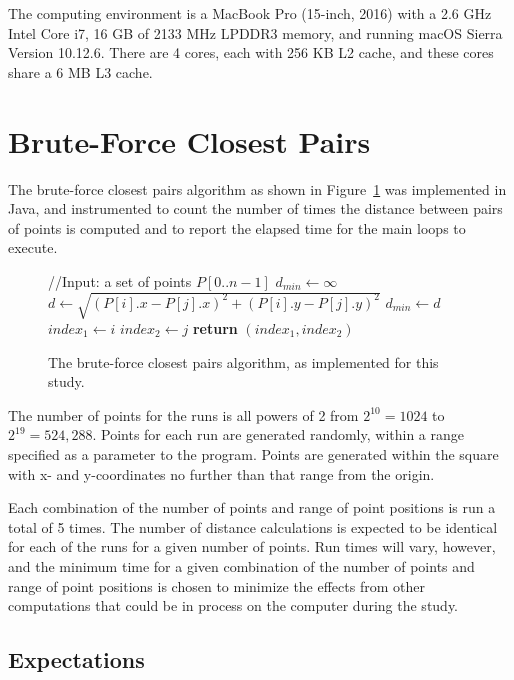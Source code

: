\documentclass[12pt]{article}
\begin{document}
The computing environment is a MacBook Pro (15-inch, 2016) with a 2.6
GHz Intel Core i7, 16 GB of 2133 MHz LPDDR3 memory, and running macOS
Sierra Version 10.12.6.  There are 4 cores, each with 256 KB L2 cache,
and these cores share a 6 MB L3 cache.

\section{Brute-Force Closest Pairs}
\label{sec:bfcp}

The brute-force closest pairs algorithm as shown in
Figure~\ref{fig:alg} was implemented in Java, and instrumented to
count the number of times the distance between pairs of points is
computed and to report the elapsed time for the main loops to execute.

\begin{figure}[htb]
  \centering
\begin{algorithmic}
  \State //Input: a set of points $P[0..n-1]$
  \State $d_{min} \gets \infty$
  \State $d \gets \sqrt{(P[i].x - P[j].x)^2 +(P[i].y - P[j].y)^2}$
  \State $d_{min} \gets d$
  \State $index_1 \gets i$
  \State $index_2 \gets j$
  \EndIf
  \EndFor
  \EndFor
  \State \textbf{return} $(index_1, index_2)$
\EndProcedure
\end{algorithmic}
\caption{The brute-force closest pairs algorithm, as implemented for
  this study.}
\label{fig:alg}
\end{figure}

The number of points for the runs is all powers of 2 from
$2^{10}=1024$ to $2^{19}=524,288$.  Points for each run are generated
randomly, within a range specified as a parameter to the program.
Points are generated within the square with x- and y-coordinates no
further than that range from the origin.

Each combination of the number of points and range of point positions
is run a total of 5 times.  The number of distance calculations is
expected to be identical for each of the runs for a given number of
points.  Run times will vary, however, and the minimum time for a
given combination of the number of points and range of point positions
is chosen to minimize the effects from other computations that could
be in process on the computer during the study.


\subsection{Expectations}
\end{document}
